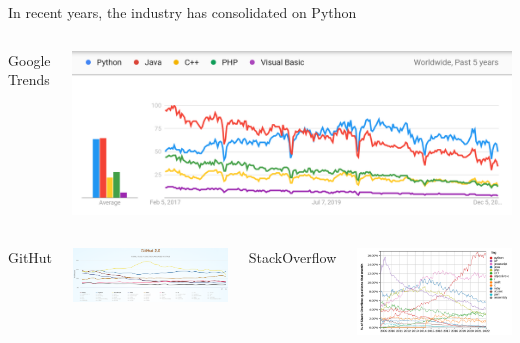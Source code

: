 \documentclass[aspectratio=169]{beamer}
\begin{document}
\begin{frame}{In recent years, the industry has consolidated on Python}
\begin{columns}[t]
\centering Google Trends

\vspace{0.1 cm}
\includegraphics[width=\linewidth]{PLOTS/python-rankings-googletrends-2022.png}
\end{columns}

\vspace{0.25 cm}
\begin{columns}[t]
\centering GitHut

\vspace{0.1 cm}
\includegraphics[width=\linewidth]{PLOTS/python-rankings-githut-2022.png}

\centering StackOverflow

\vspace{0.1 cm}
\includegraphics[width=\linewidth]{PLOTS/python-rankings-stackoverflow-2022.png}
\end{columns}
\end{frame}
\end{document}
